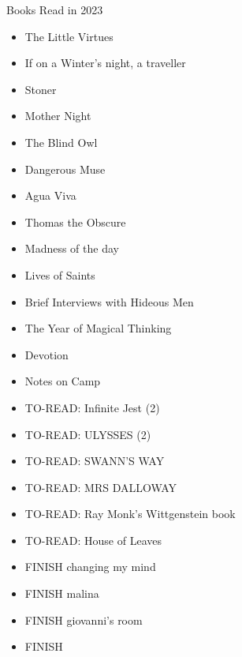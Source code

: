 Books Read in 2023
\begin{itemize}
    \item The Little Virtues
    \item If on a Winter's night, a traveller
    \item Stoner
    \item Mother Night
    \item The Blind Owl
    \item Dangerous Muse
    \item Agua Viva
    \item Thomas the Obscure
    \item Madness of the day
    \item Lives of Saints
    \item Brief Interviews with Hideous Men
    \item The Year of Magical Thinking
    \item Devotion
    \item Notes on Camp
    \item TO-READ: Infinite Jest (2)
    \item TO-READ: ULYSSES (2)
    \item TO-READ: SWANN'S WAY
    \item TO-READ: MRS DALLOWAY
    \item TO-READ: Ray Monk's Wittgenstein book
    \item TO-READ: House of Leaves
    \item FINISH changing my mind
    \item FINISH malina
    \item FINISH giovanni's room
    \item FINISH 
\end{itemize}